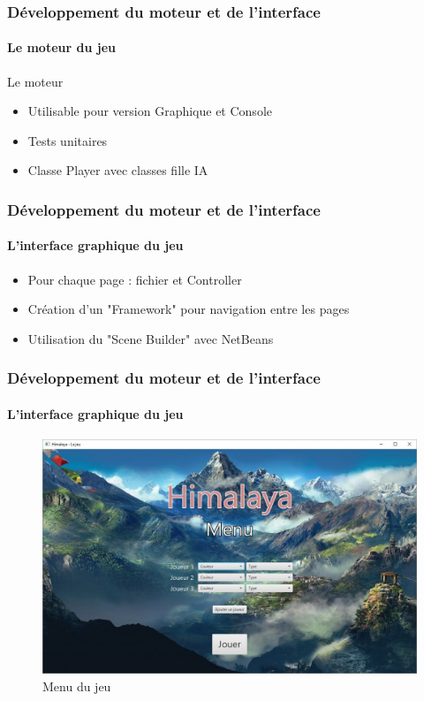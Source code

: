 	\begin{frame}
		\frametitle{Développement du moteur et de l'interface}
		\framesubtitle{Le moteur du jeu}
		\begin{block}{Le moteur}
			\begin{itemize}
				\item Utilisable pour version Graphique et Console
				\item Tests unitaires
				\item Classe Player avec classes fille IA
			\end{itemize}
		\end{block}	
	\end{frame}

	\begin{frame}
		\frametitle{Développement du moteur et de l'interface}
		\framesubtitle{L'interface graphique du jeu}
		\begin{block}{\fx}
			\begin{itemize}
				\item Pour chaque page : fichier \fxml et Controller 
				\item Création d'un "Framework" pour navigation entre les pages
				\item Utilisation du "Scene Builder" avec NetBeans
			\end{itemize}
		\end{block}	
	\end{frame}
	
	\begin{frame}
		\frametitle{Développement du moteur et de l'interface}
		\framesubtitle{L'interface graphique du jeu}
		\begin{figure}[h]
			\centering
			\includegraphics[width=0.8\linewidth]{images/menu}
			\caption{Menu du jeu}
			\label{fig:menu}
		\end{figure}
	\end{frame}
	
